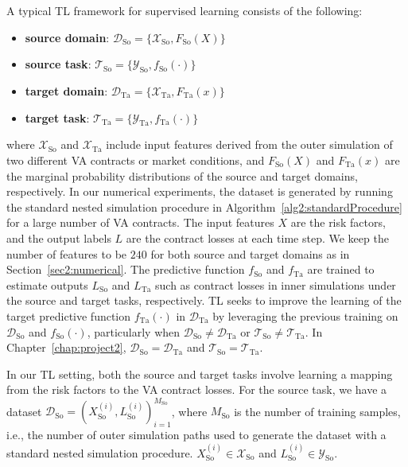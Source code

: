 A typical TL framework for supervised learning consists of the following:
\begin{itemize}
    \item   \textbf{source domain}: $\mathcal{D}_{\text{So}} = \{\mathcal{X}_{\text{So}}, F_{\text{So}}(X)\}$
    \item   \textbf{source task}: $\mathcal{T}_{\text{So}} = \{\mathcal{Y}_{\text{So}}, f_{\text{So}}(\cdot)\}$
    \item   \textbf{target domain}: $\mathcal{D}_{\text{Ta}} = \{\mathcal{X}_{\text{Ta}}, F_{\text{Ta}}(x)\}$
    \item   \textbf{target task}: $\mathcal{T}_{\text{Ta}} = \{\mathcal{Y}_{\text{Ta}}, f_{\text{Ta}}(\cdot)\}$
\end{itemize}

where $\mathcal{X}_{\text{So}}$ and $\mathcal{X}_{\text{Ta}}$ include input features derived from the outer simulation of two different VA contracts or market conditions, and $F_{\text{So}}(X)$ and $F_{\text{Ta}}(x)$ are the marginal probability distributions of the source and target domains, respectively.
In our numerical experiments, the dataset is generated by running the standard nested simulation procedure in Algorithm~\ref{alg2:standardProcedure} for a large number of VA contracts.
The input features $X$ are the risk factors, and the output labels $L$ are the contract losses at each time step.
We keep the number of features to be $240$ for both source and target domains as in Section~\ref{sec2:numerical}.
The predictive function $f_{\text{So}}$ and $f_{\text{Ta}}$ are trained to estimate outputs $L_{\text{So}}$ and $L_{\text{Ta}}$ such as contract losses in inner simulations under the source and target tasks, respectively.
TL seeks to improve the learning of the target predictive function $f_{\text{Ta}}(\cdot)$ in $\mathcal{D}_{\text{Ta}}$ by leveraging the previous training on $\mathcal{D}_{\text{So}}$ and $f_{\text{So}}(\cdot)$, particularly when $\mathcal{D}_{\text{So}} \neq \mathcal{D}_{\text{Ta}}$ or $\mathcal{T}_{\text{So}} \neq \mathcal{T}_{\text{Ta}}$.
In Chapter~\ref{chap:project2}, $\mathcal{D}_{\text{So}} = \mathcal{D}_{\text{Ta}}$ and $\mathcal{T}_{\text{So}} = \mathcal{T}_{\text{Ta}}$.

In our TL setting, both the source and target tasks involve learning a mapping from the risk factors to the VA contract losses.
For the source task, we have a dataset $\mathcal{D}_{\text{So}} = { (X_{\text{So}}^{(i)}, L_{\text{So}}^{(i)}) }_{i=1}^{M_{\text{So}}}$, where $M_{\text{So}}$ is the number of training samples, i.e., the number of outer simulation paths used to generate the dataset with a standard nested simulation procedure.
$X_{\text{So}}^{(i)} \in \mathcal{X}_{\text{So}}$ and $L_{\text{So}}^{(i)} \in \mathcal{Y}_{\text{So}}$.
 
